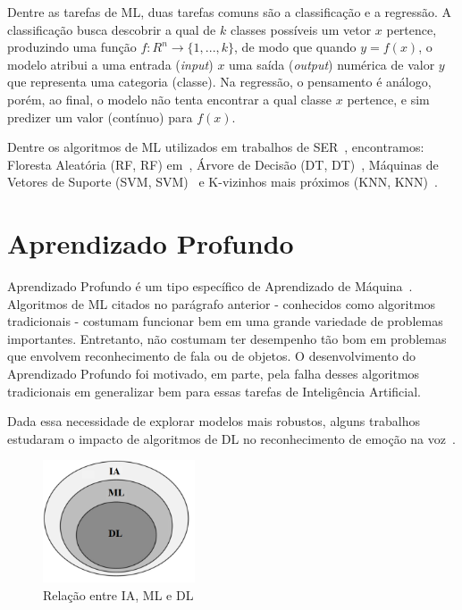 Dentre as tarefas de \acrshort{ML}, duas tarefas comuns são a classificação e a regressão. A classificação busca descobrir a qual de $k$ classes possíveis um vetor $x$ pertence, produzindo uma função $f: R^n \rightarrow \{1, ..., k\}$, de modo que quando $y = f(x)$, o modelo atribui a uma entrada (\textit{input}) $x$ uma saída (\textit{output}) numérica de valor $y$ que representa uma categoria (classe). Na regressão, o pensamento é análogo, porém, ao final, o modelo não tenta encontrar a qual classe $x$ pertence, e sim predizer um valor (contínuo) para $f(x)$.

Dentre os algoritmos de \acrshort{ML} utilizados em trabalhos de \acrshort{SER}~\cite{20.7}, encontramos: Floresta Aleatória (\acrlong{RF}, \acrshort{RF}) em~\cite{20.10}, Árvore de Decisão (\acrlong{DT}, \acrshort{DT})~\cite{20.11}, Máquinas de Vetores de Suporte (\acrlong{SVM}, \acrshort{SVM})~\cite{20.13} e K-vizinhos mais próximos (\acrlong{KNN}, \acrshort{KNN})~\cite{20.15}.

\section{Aprendizado Profundo}\label{sec:dl}

Aprendizado Profundo é um tipo específico de Aprendizado de Máquina~\cite{53}. Algoritmos de \acrshort{ML} citados no parágrafo anterior - conhecidos como algoritmos tradicionais - costumam funcionar bem em uma grande variedade de problemas importantes. Entretanto, não costumam ter desempenho tão bom em problemas que envolvem reconhecimento de fala ou de objetos. O desenvolvimento do Aprendizado Profundo foi motivado, em parte, pela falha desses algoritmos tradicionais em generalizar bem para essas tarefas de Inteligência Artificial.

Dada essa necessidade de explorar modelos mais robustos, alguns trabalhos estudaram o impacto de algoritmos de \acrlong{DL} no reconhecimento de emoção na voz~\cite{12.12, 12.16}.

\begin{figure}[!h]
\centering
\includegraphics[width=0.4\textwidth]{img/ia-ml-dl-3.png}
\caption{\label{fig:ia-ml-dl}Relação entre \acrshort{IA}, \acrshort{ML} e \acrshort{DL}~\cite{img_iavsmlvsdl}}
\author{Fonte: Retirada de~\cite{58}}
\end{figure}

